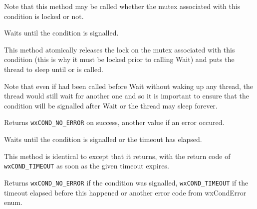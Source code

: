 Note that this method may be called whether the mutex associated with this
condition is locked or not.



\label{wxconditionwait}


Waits until the condition is signalled.

This method atomically releases the lock on the mutex associated with this
condition (this is why it must be locked prior to calling Wait) and puts the
thread to sleep until  or 
 is called.

Note that even if  had been called before
Wait without waking up any thread, the thread would still wait for another one
and so it is important to ensure that the condition will be signalled after
Wait or the thread may sleep forever.


Returns {\tt wxCOND\_NO\_ERROR} on success, another value if an error occured.




\label{wxconditionwaittimeout}


Waits until the condition is signalled or the timeout has elapsed.

This method is identical to  except that it
returns, with the return code of {\tt wxCOND\_TIMEOUT} as soon as the given
timeout expires.




Returns {\tt wxCOND\_NO\_ERROR} if the condition was signalled, 
{\tt wxCOND\_TIMEOUT} if the timeout elapsed before this happened or another
error code from wxCondError enum.

